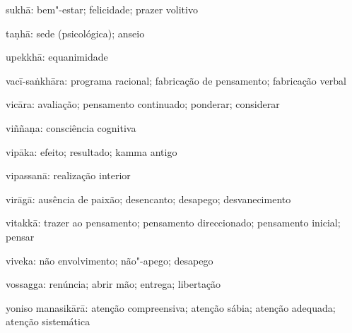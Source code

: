 \begin{glossarydescription}
\item[sukhā:] bem"-estar; felicidade; prazer volitivo

\item[taṇhā:] sede (psicológica); anseio

\item[upekkhā:] equanimidade

\item[vacī-saṅkhāra:] programa racional; fabricação de pensamento; fabricação verbal

\item[vicāra:] avaliação; pensamento continuado; ponderar; considerar

\item[viññaṇa:] consciência cognitiva

\item[vipāka:] efeito; resultado; kamma antigo

\item[vipassanā:] realização interior

\item[virāgā:] ausência de paixão; desencanto; desapego; desvanecimento

\item[vitakkā:] trazer ao pensamento; pensamento direccionado; pensamento inicial; pensar

\item[viveka:] não envolvimento; não"-apego; desapego

\item[vossagga:] renúncia; abrir mão; entrega; libertação

\item[yoniso manasikārā:] atenção compreensiva; atenção sábia; atenção adequada; atenção sistemática

\end{glossarydescription}
